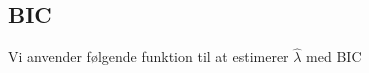 \subsection{BIC} \label{sub:bic}
Vi anvender følgende funktion til at estimerer $\widehat{\lambda}$ med BIC
